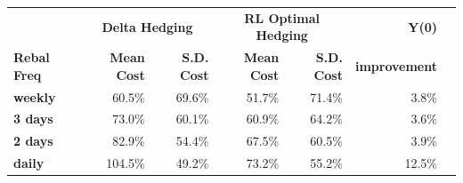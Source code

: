 \documentclass{article}
\begin{document}
\begin{table}[htbp]
\centering
\vspace{0.4em}
\begin{tabular}{lrrrrrr}
\hline
 & \multicolumn{2}{c}{\textbf{Delta Hedging}} & \multicolumn{2}{c}{\textbf{RL Optimal Hedging}} & \textbf{Y(0)} \\
\textbf{Rebal Freq} & \textbf{Mean Cost} & \textbf{S.D. Cost} & \textbf{Mean Cost} & \textbf{S.D. Cost} & \textbf{improvement} \\
\hline
\textbf{weekly} & 60.5\% & 69.6\% & 51.7\% & 71.4\% & 3.8\% \\
\textbf{3 days} & 73.0\% & 60.1\% & 60.9\% & 64.2\% & 3.6\% \\
\textbf{2 days} & 82.9\% & 54.4\% & 67.5\% & 60.5\% & 3.9\% \\
\textbf{daily} & 104.5\% & 49.2\% & 73.2\% & 55.2\% & 12.5\% \\
\hline
\end{tabular}
\end{table}
\end{document}
